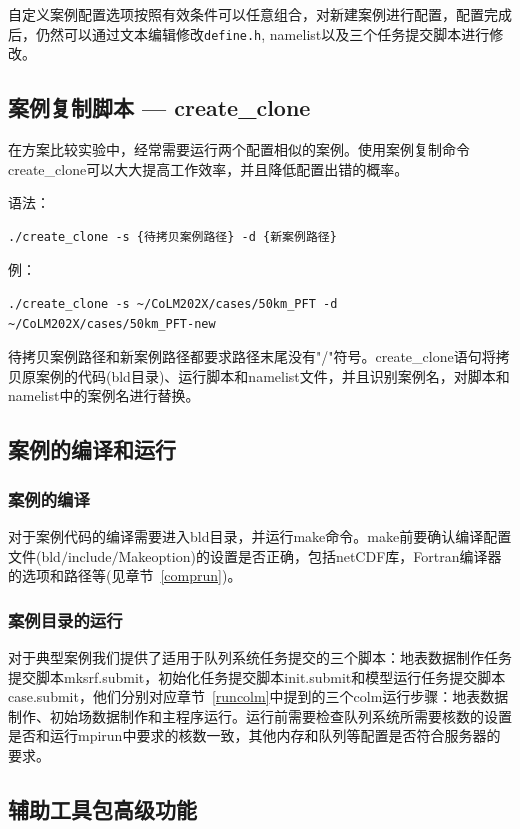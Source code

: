 自定义案例配置选项按照有效条件可以任意组合，对新建案例进行配置，配置完成后，仍然可以通过文本编辑修改\texttt{define.h}, namelist以及三个任务提交脚本进行修改。

\subsection{案例复制脚本 --- create\_clone}

在方案比较实验中，经常需要运行两个配置相似的案例。使用案例复制命令create\_clone可以大大提高工作效率，并且降低配置出错的概率。

语法：
\begin{lstlisting}[xleftmargin=2.5em]
./create_clone -s {待拷贝案例路径} -d {新案例路径}
\end{lstlisting}

例：
\begin{lstlisting}[xleftmargin=2.5em]
./create_clone -s ~/CoLM202X/cases/50km_PFT -d ~/CoLM202X/cases/50km_PFT-new
\end{lstlisting}

待拷贝案例路径和新案例路径都要求路径末尾没有"/"符号。create\_clone语句将拷贝原案例的代码(bld目录)、运行脚本和namelist文件，并且识别案例名，对脚本和namelist中的案例名进行替换。

\subsection{案例的编译和运行}
\subsubsection{案例的编译}
对于案例代码的编译需要进入bld目录，并运行make命令。make前要确认编译配置文件(bld$\slash$include$\slash$Makeoption)的设置是否正确，包括netCDF库，Fortran编译器的选项和路径等(见章节~\ref{comprun})。

\subsubsection{案例目录的运行}
对于典型案例我们提供了适用于队列系统任务提交的三个脚本：地表数据制作任务提交脚本mksrf.submit，初始化任务提交脚本init.submit和模型运行任务提交脚本case.submit，他们分别对应章节~\ref{runcolm}中提到的三个colm运行步骤：地表数据制作、初始场数据制作和主程序运行。运行前需要检查队列系统所需要核数的设置是否和运行mpirun中要求的核数一致，其他内存和队列等配置是否符合服务器的要求。

\subsection{辅助工具包高级功能}

